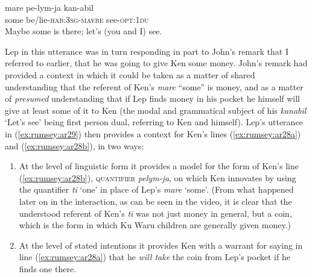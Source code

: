 \documentclass[output=paper]{langsci/langscibook}
\begin{document}
\begin{exe}
	\ex \label{ex:rumsey:ar29}
	\gll mare pe-lym-ja kan-abil\\
	some be/lie-\textsc{hab}:3\textsc{sg}-\textsc{maybe} see-\textsc{opt}:1\textsc{du}\\
	\trans Maybe some is there; let’s (you and I) see.
\end{exe}

Lep in this utterance was in turn responding in part to John’s remark that I referred to earlier, that he was going to give Ken some money. John’s remark had provided a context in which it could be taken as a matter of shared understanding that the referent of Ken’s \emph{mare} “some” is money, and as a matter of \emph{presumed} understanding that if Lep finds money in his pocket he himself will give at least some of it to Ken (the modal and grammatical subject of his \textit{kanabil} ‘Let’s see’ being first person dual, referring to Ken and himself). Lep’s utterance in (\ref{ex:rumsey:ar29}) then provides a context for Ken’s lines (\ref{ex:rumsey:ar28a}) and (\ref{ex:rumsey:ar28b}), in two ways:

\begin{enumerate}[label=\arabic*)]
	\item At the level of linguistic form it provides a model for the form of Ken’s line (\ref{ex:rumsey:ar28b}), \textsc{quantifier} \textit{pelym-ja}, on which Ken innovates by using the quantifier \textit{ti} ‘one’ in place of Lep’s \textit{mare} ‘some’. (From what happened later on in the interaction, as can be seen in the video, it is clear that the understood referent of Ken’s \textit{ti} was not just money in general, but a coin, which is the form in which Ku Waru children are generally given money.)
	\item At the level of stated intentions it provides Ken with a warrant for saying in line (\ref{ex:rumsey:ar28a}) that he \emph{will take} the coin from Lep’s pocket if he finds one there.
\end{enumerate}
\end{document}
